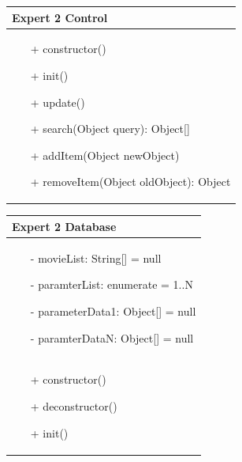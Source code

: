 \documentclass[]{article}
\begin{document}
\begin{table}[H]
\centering
\begin{tabular}{|>{\centering\arraybackslash}p{10cm}|}
\hline
Expert 2 Control\\
\hline
\begin{itemize}
\item[+] constructor()
\item[+] init()
\item[+] update()
\item[+] search(Object query): Object[]
\item[+] addItem(Object newObject)
\item[+] removeItem(Object oldObject): Object
\end{itemize}
\\
\hline
\end{tabular}
\end{table}
%
\begin{table}[H]
\centering
\begin{tabular}{|>{\centering\arraybackslash}p{10cm}|}
\hline
Expert 2 Database\\
\hline
\begin{itemize}
\item[-] movieList: String[] = null
\item[-] paramterList: enumerate = 1..N
\item[-] parameterData1: Object[] = null
\item[-] paramterDataN: Object[] = null
\end{itemize}
\\
\hline
\begin{itemize}
\item[+] constructor()
\item[+] deconstructor()
\item[+] init()
\end{itemize}
\\
\hline
\end{tabular}
\end{table}
%
\end{document}
